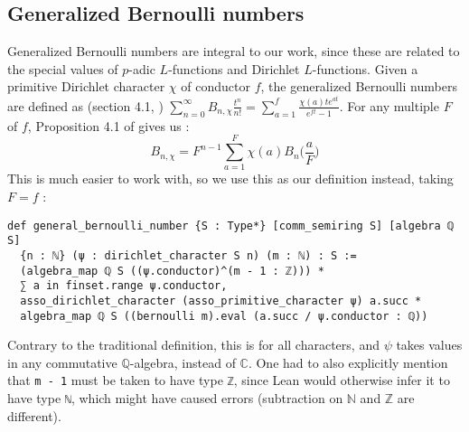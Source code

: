 \documentclass[a4paper,UKenglish,cleveref, autoref, thm-restate]{lipics-v2021}
\newcommand{\lean}[1]{\texttt{#1}\xspace} %
\begin{document}
\subsection{Generalized Bernoulli numbers}
Generalized Bernoulli numbers are integral to our work, since these are related to the special values of $p$-adic $L$-functions and Dirichlet $L$-functions. 
Given a primitive Dirichlet character $\chi$ of conductor $f$, the generalized Bernoulli numbers are defined as (section 4.1, \cite{cyc}) 
$ \sum_{n = 0}^{\infty} B_{n,\chi} \frac{t^n}{n!} = \sum_{a = 1}^f \frac{\chi(a)t e^{at}}{e^{ft} - 1} $. 
For any multiple $F$ of $f$, Proposition 4.1 of \cite{cyc} gives us : 
$$ B_{n, \chi} = F^{n - 1} \sum_{a = 1}^{F} \chi (a) B_n \bigg( \frac{a}{F} \bigg) $$
This is much easier to work with, so we use this as our definition instead, taking $F = f$ :
\begin{lstlisting}
def general_bernoulli_number {S : Type*} [comm_semiring S] [algebra ℚ S] 
  {n : ℕ} (ψ : dirichlet_character S n) (m : ℕ) : S :=
  (algebra_map ℚ S ((ψ.conductor)^(m - 1 : ℤ))) * 
  ∑ a in finset.range ψ.conductor,
  asso_dirichlet_character (asso_primitive_character ψ) a.succ * 
  algebra_map ℚ S ((bernoulli m).eval (a.succ / ψ.conductor : ℚ))
\end{lstlisting}
Contrary to the traditional definition, this is for all characters, and $\psi$ takes values 
in any commutative $\mathbb{Q}$-algebra, instead of $\mathbb{C}$. One had to also explicitly mention that \lean{m - 1} must be taken to have type \lean{ℤ}, since Lean would otherwise infer 
it to have type \lean{ℕ}, which might have caused errors (subtraction on $\mathbb{N}$ 
and $\mathbb{Z}$ are different).

\end{document}
